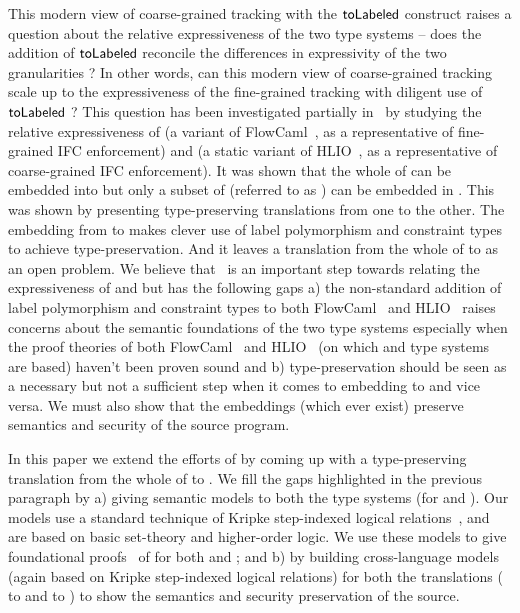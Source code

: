 This modern view of coarse-grained tracking with the $\mathsf{toLabeled}$ construct raises a question about
the relative expressiveness of the two type systems -- does the addition of $\mathsf{toLabeled}$ reconcile
the differences in expressivity of the two granularities ? In other words, can this modern view of
coarse-grained tracking scale up to the expressiveness of the fine-grained tracking with diligent
use of $\mathsf{toLabeled}$ ? This question has been investigated partially in~\cite{siglog17-ifcComp} by
studying the relative expressiveness of {\fg} (a variant of FlowCaml~\cite{toplas03-flowcaml}, as a
representative of fine-grained IFC enforcement) and {\cg} (a static variant of
HLIO~\cite{icfp15-HLIO}, as a representative of coarse-grained IFC enforcement). It was shown that
the whole of {\cg} can be embedded into {\fg} but only a subset of {\fg} (referred to as {\rfg}) can
be embedded in {\cg}. This was shown by presenting type-preserving translations from one to the
other. The embedding from {\rfg} to {\cg} makes clever use of label polymorphism and constraint
types to achieve type-preservation. And it leaves a translation from the whole of {\fg} to {\cg} as
an open problem. We believe that~\cite{siglog17-ifcComp} is an important step towards relating the
expressiveness of {\fg} and {\cg} but has the following gaps a) the non-standard addition of label
polymorphism and constraint types to both FlowCaml~\cite{toplas03-flowcaml} and
HLIO~\cite{icfp15-HLIO} raises concerns about the semantic foundations of the two type systems
especially when the proof theories of both FlowCaml~\cite{toplas03-flowcaml} and
HLIO~\cite{icfp15-HLIO} (on which {\fg} and {\cg} type systems are based) haven't been proven sound
and b) type-preservation should be seen as a necessary but not a sufficient step when it comes to
embedding {\fg} to {\cg} and vice versa. We must also show that the embeddings (which ever exist)
preserve semantics and security of the source program.

In this paper we extend the efforts of \cite{siglog17-ifcComp} by coming up with a type-preserving
translation from the whole of {\fg} to {\cg}. We fill the gaps highlighted in the previous paragraph
by a) giving semantic models to both the type systems (for {\fg} and {\cg}). Our models use a
standard technique of Kripke step-indexed logical relations~\cite{esop06-SILR}, and are based on
basic set-theory and higher-order logic. We use these models to give foundational
proofs~\cite{popl00-semanticModelPCC} of {\NI} for both {\fg} and {\cg}; and b) by building
cross-language models (again based on Kripke step-indexed logical relations) for both the
translations ({\cg} to {\fg} and {\fg} to {\cg}) to show the semantics and security preservation of
the source.

